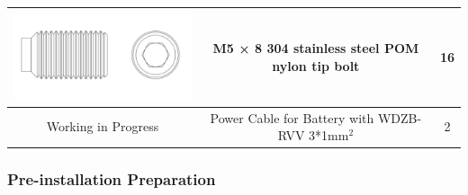 \documentclass{article}
\begin{document}
\begin{table}[htbp]
\begin{tabular}{|c|c|c|}
        \includegraphics{M5x8.png}              &  M5 × 8 304 stainless steel POM nylon tip bolt           & 16 \\ \hline
        Working in Progress                     & Power Cable for Battery with WDZB-RVV 3*1mm$^2$             & 2 \\   \hline
    \end{tabular}
    \end{table}
\subsubsection{Pre-installation Preparation}
\end{document}
